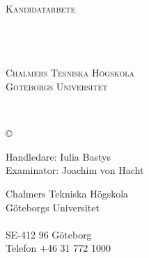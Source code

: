 \newpage
\thispagestyle{empty}
\begin{center}

	\textsc{\large Kandidatarbete \the\year }\\[4cm]

	\textbf{\Large \ambaTitle} \\[1cm]

    {\linespread{1.2}\large
        \StrSubstitute{\ambaAuthors}{,}{\\}
        \\
    }

	\vfill

	\ambaDepartmentSwedish \\
	\textsc{Chalmers Tesniska Högskola} \\
	\textsc{Göteborgs Universitet} \\
	\ambaCityCountryYearSwedish
\end{center}


\newpage
{\ambaTitle}\\
\textsc{\ambaAuthors}
\setlength{\parskip}{0.5cm}

\copyright{~\textsc{\ambaAuthors \the\year}}
\setlength{\parskip}{1cm}

Handledare: Iulia Bastys \\
Examinator: Joachim von Hacht \setlength{\parskip}{1cm}

Chalmers Tekniska Högskola\\
Göteborgs Universitet\\
\ambaDepartmentSwedish \\
SE-412 96 Göteborg\\
Telefon +46 31 772 1000 \setlength{\parskip}{0.5cm}

\vfill
\ambaCityCountryYearSwedish
